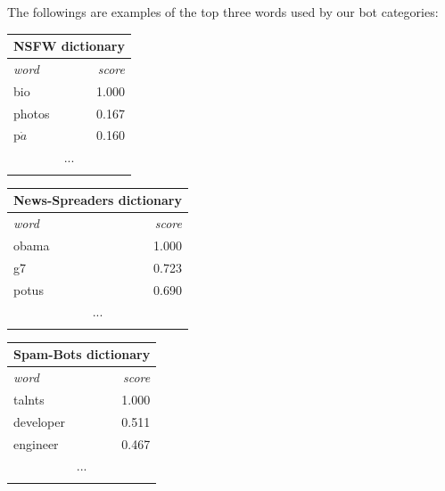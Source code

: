 The followings are examples of the top three words used by our bot categories:
\small
\begin{center}
	\begin{tabular}{lllll}
		\multicolumn{5}{c}{\textbf{NSFW dictionary}} \\
		\hline\hline
		\multicolumn{4}{l}{\textit{word}} & 
		\multicolumn{1}{r}{\textit{score}}\\
		\hline\hline
		\multicolumn{4}{l}{bio} & 
		\multicolumn{1}{r}{1.000}\\
		\multicolumn{4}{l}{photos} & 
		\multicolumn{1}{r}{0.167}\\
		\multicolumn{4}{l}{p$ \dot{a} $} & 
		\multicolumn{1}{r}{0.160}\\
		\multicolumn{5}{c}{...} \\
		\hline\\
	\end{tabular}
\end{center}
\normalsize
\small
\begin{center}
	\begin{tabular}{lllll}
		\multicolumn{5}{c}{\textbf{News-Spreaders dictionary}} \\
		\hline\hline
		\multicolumn{4}{l}{\textit{word}} & 
		\multicolumn{1}{r}{\textit{score}}\\
		\hline\hline
		\multicolumn{4}{l}{obama} & 
		\multicolumn{1}{r}{1.000}\\
		\multicolumn{4}{l}{g7} & 
		\multicolumn{1}{r}{0.723}\\
		\multicolumn{4}{l}{potus} & 
		\multicolumn{1}{r}{0.690}\\
		\multicolumn{5}{c}{...} \\
		\hline\\
	\end{tabular}
\end{center}
\normalsize
\small
\begin{center}
	\begin{tabular}{lllll}
		\multicolumn{5}{c}{\textbf{Spam-Bots dictionary}} \\
		\hline\hline
		\multicolumn{4}{l}{\textit{word}} & 
		\multicolumn{1}{r}{\textit{score}}\\
		\hline\hline
		\multicolumn{4}{l}{talnts} & 
		\multicolumn{1}{r}{1.000}\\
		\multicolumn{4}{l}{developer} & 
		\multicolumn{1}{r}{0.511}\\
		\multicolumn{4}{l}{engineer} & 
		\multicolumn{1}{r}{0.467}\\
		\multicolumn{5}{c}{...} \\
		\hline\\
	\end{tabular}
\end{center}

